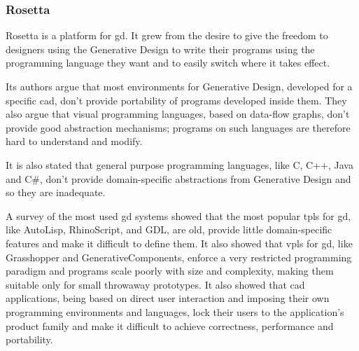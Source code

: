 \documentclass{./llncs2e/llncs}
\begin{document}
	

\subsubsection{Rosetta\cite{de2012modern}}
	Rosetta is a platform for \ac{gd}.
	It grew from the desire to give the freedom to designers using the Generative Design to write their programs using the programming language they want and to easily switch where it takes effect.
	
	Its authors argue that most environments for Generative Design, developed for a specific \ac{cad}, don't provide portability of programs developed inside them.
	They also argue that visual programming languages, based on data-flow graphs, don't provide good abstraction mechanisms; programs on such languages are therefore hard to understand and modify.
	
	It is also stated that general purpose programming languages, like C, C++, Java and C\#, don't provide domain-specific abstractions from Generative Design and so they are inadequate.
	
	A survey of the most used \ac{gd} systems showed that the most popular \ac{tpl}s for \ac{gd}, like AutoLisp, RhinoScript, and GDL, are old, provide little domain-specific features and make it difficult to define them.
	It also showed that \ac{vpl}s for \ac{gd}, like Grasshopper and GenerativeComponents, enforce a very restricted programming paradigm and programs scale poorly with size and complexity, making them suitable only for small throwaway prototypes. 
	It also showed that \ac{cad} applications, being based on direct user interaction and imposing their own programming environments and languages, lock their users to the application's product family and make it difficult to achieve correctness, performance and portability.
	
\end{document}
